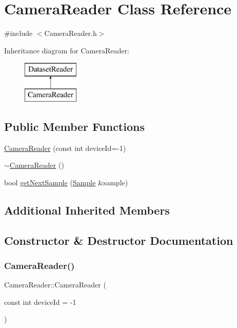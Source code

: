 \hypertarget{class_camera_reader}{}\section{Camera\+Reader Class Reference}
\label{class_camera_reader}


{\ttfamily \#include $<$Camera\+Reader.\+h$>$}

Inheritance diagram for Camera\+Reader\+:\begin{figure}[H]
\begin{center}
\leavevmode
\includegraphics[height=2.000000cm]{class_camera_reader}
\end{center}
\end{figure}
\subsection*{Public Member Functions}
\begin{DoxyCompactItemize}
\item 
\hyperlink{class_camera_reader_a5a2e58b58ce226e9bcee25151b6e8a21}{Camera\+Reader} (const int device\+Id=-\/1)
\item 
\hyperlink{class_camera_reader_a8d12e1db2e1f910ec89ed1e4bdd73392}{$\sim$\+Camera\+Reader} ()
\item 
bool \hyperlink{class_camera_reader_a1b78cca892789abc2294d56afab3146d}{get\+Next\+Sample} (\hyperlink{struct_sample}{Sample} \&sample)
\end{DoxyCompactItemize}
\subsection*{Additional Inherited Members}


\subsection{Constructor \& Destructor Documentation}
\mbox{\label{class_camera_reader_a5a2e58b58ce226e9bcee25151b6e8a21}} 
\subsubsection{\texorpdfstring{Camera\+Reader()}{CameraReader()}}
{\footnotesize\ttfamily Camera\+Reader\+::\+Camera\+Reader (\begin{DoxyParamCaption}\item[{const int}]{device\+Id = {\ttfamily -\/1} }\end{DoxyParamCaption})}

